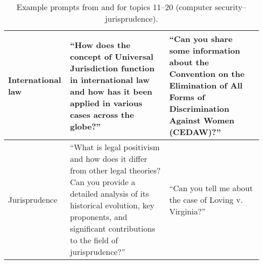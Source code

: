 \begin{table}[th]
\begin{tabular}{m{28mm} m{45mm} m{45mm}}
        \midrule
        International law & ``How does the concept of Universal Jurisdiction function in international law and how has it been applied in various cases across the globe?'' & ``Can you share some information about the Convention on the Elimination of All Forms of Discrimination Against Women (CEDAW)?'' \\
        \midrule
        Jurisprudence & ``What is legal positivism and how does it differ from other legal theories? Can you provide a detailed analysis of its historical evolution, key proponents, and significant contributions to the field of jurisprudence?'' & ``Can you tell me about the case of Loving v. Virginia?'' \\
        \bottomrule
    \end{tabular}
    \caption{
    Example prompts from \longfactconcepts{} and \longfactobjects{} for topics 11--20 (computer security--jurisprudence).
    }
    \label{tab:longfact-example-prompts-2}
\end{table}

